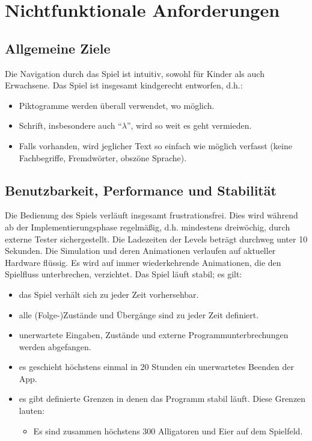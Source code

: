 \section{Nichtfunktionale Anforderungen}

\subsection{Allgemeine Ziele}
\begin{requirements}
	 Die Navigation durch das Spiel ist intuitiv, sowohl für Kinder als auch Erwachsene.
	 Das Spiel ist insgesamt kindgerecht entworfen, d.h.:
		\begin{itemize}
			\item Piktogramme werden überall verwendet, wo möglich.
			\item Schrift, insbesondere auch "`$\lambda$"', wird so weit es geht vermieden.
			\item Falls vorhanden, wird jeglicher Text so einfach wie möglich verfasst (keine Fachbegriffe, Fremdwörter, obszöne Sprache).
		\end{itemize}
\end{requirements}

\subsection{Benutzbarkeit, Performance und Stabilität}
\begin{requirements}
	 Die Bedienung des Spiels verläuft insgesamt frustrationsfrei. Dies wird während ab der Implementierungsphase regelmäßig, d.h. mindestens dreiwöchig, durch externe Tester sichergestellt.
	 Die Ladezeiten der Levels beträgt durchweg unter 10 Sekunden.
	 Die Simulation und deren Animationen verlaufen auf aktueller Hardware flüssig.
	 Es wird auf immer wiederkehrende Animationen, die den Spielfluss unterbrechen, verzichtet.
	 Das Spiel läuft stabil; es gilt:
		\begin{itemize}
			\item das Spiel verhält sich zu jeder Zeit vorhersehbar.
			\item alle (Folge-)Zustände und Übergänge sind zu jeder Zeit definiert.
			\item unerwartete Eingaben, Zustände und externe Programmunterbrechungen werden abgefangen.
			\item es geschieht höchstens einmal in 20 Stunden ein unerwartetes Beenden der App.
			\item es gibt definierte Grenzen in denen das Programm stabil läuft. Diese Grenzen lauten:
				\begin{itemize}
					\item Es sind zusammen höchstens 300 Alligatoren und Eier auf dem Spielfeld.
				\end{itemize}
		\end{itemize}
\end{requirements}

